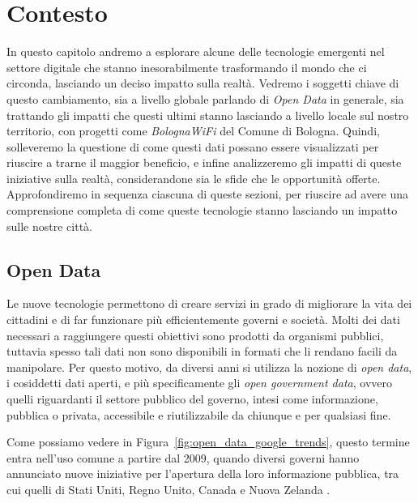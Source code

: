 \clearpage{\pagestyle{empty}\cleardoublepage}
\chapter{Contesto}
\lhead[\fancyplain{}{\bfseries\thepage}]{\fancyplain{}{\bfseries\rightmark}}

In questo capitolo andremo a esplorare alcune delle tecnologie emergenti nel settore digitale che stanno inesorabilmente trasformando il mondo che ci circonda, lasciando un deciso impatto sulla realtà. Vedremo i soggetti chiave di questo cambiamento, sia a livello globale parlando di \textit{Open Data} in generale, sia trattando gli impatti che questi ultimi stanno lasciando a livello locale sul nostro territorio, con progetti come \textit{BolognaWiFi} del Comune di Bologna. Quindi, solleveremo la questione di come questi dati possano essere visualizzati per riuscire a trarne il maggior beneficio, e infine analizzeremo gli impatti di queste iniziative sulla realtà, considerandone sia le sfide che le opportunità offerte.
Approfondiremo in sequenza ciascuna di queste sezioni, per riuscire ad avere una comprensione completa di come queste tecnologie stanno lasciando un impatto sulle nostre città.

\section{Open Data} %
Le nuove tecnologie permettono di creare servizi in grado di migliorare la vita dei cittadini e di far funzionare più efficientemente governi e società. Molti dei dati necessari a raggiungere questi obiettivi sono prodotti da organismi pubblici, tuttavia spesso tali dati non sono disponibili in formati che li rendano facili da manipolare. Per questo motivo, da diversi anni si utilizza la nozione di \textit{open data}, i cosiddetti dati aperti, e più specificamente gli \textit{open government data}, ovvero quelli riguardanti il settore pubblico del governo, intesi come informazione, pubblica o privata, accessibile e riutilizzabile da chiunque e per qualsiasi fine.

Come possiamo vedere in Figura~\ref{fig:open_data_google_trends}, questo termine entra nell'uso comune a partire dal 2009, quando diversi governi hanno annunciato nuove iniziative per l'apertura della loro informazione pubblica, tra cui quelli di Stati Uniti, Regno Unito, Canada e Nuova Zelanda \cite{OpenDataHandbook_Introduction}.

